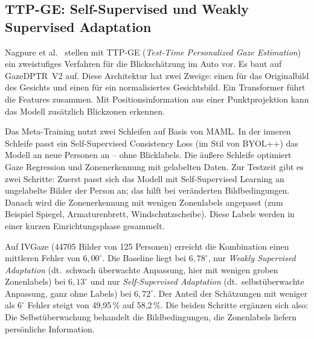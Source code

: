 \subsection{TTP-GE: Self-Supervised und Weakly Supervised Adaptation}
\label{subsec:ttpge}
Nagpure et al.~\cite{nagpure2025ttpge} stellen mit TTP-GE (\emph{Test-Time
Personalized Gaze Estimation}) ein zweistufiges Verfahren für die
Blickschätzung im Auto vor. Es baut auf GazeDPTR~V2 auf. Diese Architektur hat
zwei Zweige: einen für das Originalbild des Gesichts und einen für ein
normalisiertes Gesichtsbild. Ein Transformer führt die Features zusammen.
Mit Positionsinformation aus einer Punktprojektion kann das Modell zusätzlich
Blickzonen erkennen.

Das Meta-Training nutzt zwei Schleifen auf Basis von MAML. In der inneren
Schleife passt ein Self-Supervised Consistency Loss (im Stil von BYOL++) das
Modell an neue Personen an -- ohne Blicklabels. Die äußere Schleife optimiert
Gaze Regression und Zonenerkennung mit gelabelten Daten. Zur Testzeit gibt es
zwei Schritte: Zuerst passt sich das Modell mit Self-Supervised Learning an ungelabelte
Bilder der Person an; das hilft bei veränderten Bildbedingungen. Danach wird
die Zonenerkennung mit wenigen Zonenlabels angepasst (zum Beispiel Spiegel,
Armaturenbrett, Windschutzscheibe). Diese Labels werden in einer kurzen
Einrichtungsphase gesammelt.

Auf IVGaze (\num{44705} Bilder von 125 Personen) erreicht die Kombination
einen mittleren Fehler von $6,00^\circ$. Die Baseline liegt bei $6,78^\circ$,
nur \emph{Weakly Supervised Adaptation} (dt.\ schwach überwachte Anpassung,
hier mit wenigen groben Zonenlabels) bei $6,13^\circ$ und nur
\emph{Self-Supervised Adaptation} (dt.\ selbstüberwachte Anpassung, ganz ohne
Labels) bei $6,72^\circ$. Der Anteil der Schätzungen mit weniger als
$6^\circ$ Fehler steigt von 49,95\,\% auf 58,2\,\%. Die beiden Schritte
ergänzen sich also: Die Selbstüberwachung behandelt die Bildbedingungen, die
Zonenlabels liefern persönliche Information.

